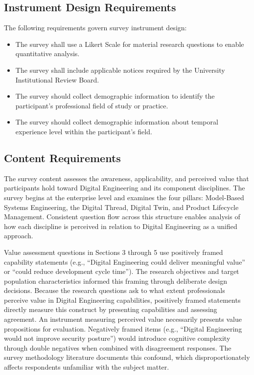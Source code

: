 \subsection{Instrument Design Requirements}

The following requirements govern survey instrument design:

\begin{itemize}
  \item The survey shall use a Likert Scale for material research questions to enable quantitative analysis.
  \item The survey shall include applicable notices required by the University Institutional Review Board.
  \item The survey should collect demographic information to identify the participant's professional field of study or practice.
  \item The survey should collect demographic information about temporal experience level within the participant's field.
\end{itemize}

\subsection{Content Requirements}

The survey content assesses the awareness, applicability, and perceived value that participants hold toward Digital Engineering and its component disciplines. The survey begins at the enterprise level and examines the four pillars: Model-Based Systems Engineering, the Digital Thread, Digital Twin, and Product Lifecycle Management. Consistent question flow across this structure enables analysis of how each discipline is perceived in relation to Digital Engineering as a unified approach.

Value assessment questions in Sections 3 through 5 use positively framed capability statements (e.g., ``Digital Engineering could deliver meaningful value'' or ``could reduce development cycle time''). The research objectives and target population characteristics informed this framing through deliberate design decisions. Because the research questions ask to what extent professionals perceive value in Digital Engineering capabilities, positively framed statements directly measure this construct by presenting capabilities and assessing agreement. An instrument measuring perceived value necessarily presents value propositions for evaluation. Negatively framed items (e.g., ``Digital Engineering would not improve security posture'') would introduce cognitive complexity through double negatives when combined with disagreement responses. The survey methodology literature documents this confound, which disproportionately affects respondents unfamiliar with the subject matter.


